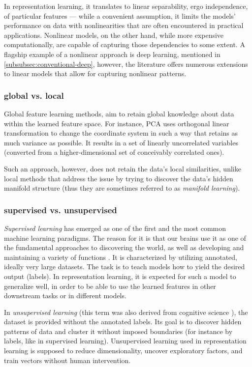 \vspace{\baselineskip}
In representation learning, it translates to linear separability, ergo independence, of particular features — while a convenient assumption, it limits the models' performance on data with nonlinearities that are often encountered in practical applications. Nonlinear models, on the other hand, while more expensive computationally, are capable of capturing those dependencies to some extent. A flagship example of a nonlinear approach is deep learning, mentioned in \autoref{subsubsec:conventional-deep}, however, the literature offers numerous extensions to linear models that allow for capturing nonlinear patterns.


\subsubsection{global vs. local}\label{subsec:taxonomy-global-local}
Global feature learning methods, aim to retain global knowledge about data within the learned feature space. For instance, PCA uses orthogonal linear transformation to change the coordinate system in such a way that retains as much variance as possible. It results in a set of linearly uncorrelated variables (converted from a higher-dimensional set of conceivably correlated ones).

\vspace{\baselineskip}
Such an approach, however, does not retain the data's local similarities, unlike local methods that address the issue by trying to discover the data's hidden manifold structure (thus they are sometimes referred to as \textit{manifold learning}).

\subsubsection{supervised vs. unsupervised}
\textit{Supervised learning} has emerged as one of the first and the most common machine learning paradigms. The reason for it is that our brains use it as one of the fundamental approaches to discovering the world, as well as developing and maintaining a variety of functions \cite{Knudsen1994}. It is characterized by utilizing annotated, ideally very large datasets. The task is to teach models how to yield the desired output (labels). In representation learning, it is expected for such a model to generalize well, in order to be able to use the learned features in other downstream tasks or in different models.

\vspace{\baselineskip}
In \textit{unsupervised learning} (this term was also derived from cognitive science \cite{Barlow1989}), the dataset is provided without the annotated labels. Its goal is to discover hidden patterns of data and cluster it without imposed boundaries (for instance by labels, like in supervised learning). Unsupervised learning used in representation learning is supposed to reduce dimensionality, uncover exploratory factors, and train vectors without human intervention.

